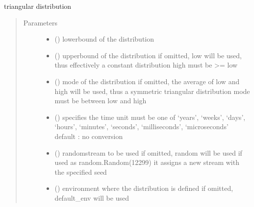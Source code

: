 \documentclass[letterpaper,10pt,english]{sphinxmanual}
\begin{document}
\begin{fulllineitems}
\label{\detokenize{Reference:salabim.Triangular}}
triangular distribution
\begin{quote}\begin{description}
\item[{Parameters}] \leavevmode\begin{itemize}
\item {} 
 () \textendash{} lowerbound of the distribution

\item {} 
 () \textendash{} upperbound of the distribution 
if omitted, low will be used, thus effectively a constant distribution 
high must be \textgreater{}= low

\item {} 
 () \textendash{} mode of the distribution 
if omitted, the average of low and high will be used, thus a symmetric triangular distribution 
mode must be between low and high

\item {} 
 () \textendash{} specifies the time unit 
must be one of ‘years’, ‘weeks’, ‘days’, ‘hours’, ‘minutes’, ‘seconds’, ‘milliseconds’, ‘microseconds’ 
default : no conversion 

\item {} 
 () \textendash{} randomstream to be used 
if omitted, random will be used 
if used as random.Random(12299)
it assigns a new stream with the specified seed

\item {} 
 ({\hyperref[\detokenize{Reference:salabim.Environment}]{}}) \textendash{} environment where the distribution is defined 
if omitted, default\_env will be used

\end{itemize}

\end{description}\end{quote}


\end{fulllineitems}
\end{document}
